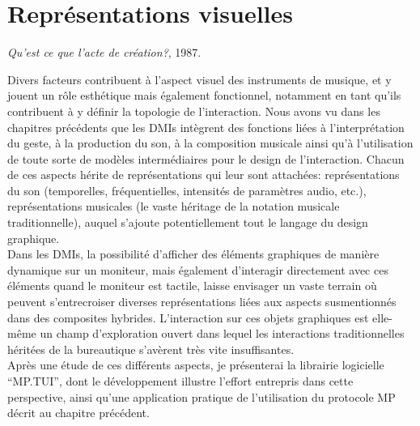 %
\chapter{Représentations visuelles}
\label{ch:visual_representation}

{\textit{Qu'est ce que l'acte de création?}, 1987.\\\cite{deleuze_deux_2003}}

\vspace*{\fill}


\noindent Divers facteurs contribuent à l'aspect visuel des instruments de musique, et y jouent un rôle esthétique mais également fonctionnel, notamment en tant qu'ils contribuent à y définir la topologie de l'interaction. Nous avons vu dans les chapitres précédents que les \glspl{DMI} intègrent des fonctions liées à l'interprétation du geste, à la production du son, à la composition musicale ainsi qu'à l'utilisation de toute sorte de modèles intermédiaires pour le design de l'interaction. Chacun de ces aspects hérite de représentations qui leur sont attachées: représentations du son (temporelles, fréquentielles, intensités de paramètres audio, etc.), représentations musicales (le vaste héritage de la notation musicale traditionnelle), auquel s'ajoute potentiellement tout le langage du design graphique.\\
\indent Dans les \glspl{DMI}, la possibilité d'afficher des éléments graphiques de manière dynamique sur un moniteur, mais également d'interagir directement avec ces éléments quand le moniteur est tactile, laisse envisager un vaste terrain où peuvent s'entrecroiser diverses représentations liées aux aspects susmentionnés dans des composites hybrides. L'interaction sur ces objets graphiques est elle-même un champ d'exploration ouvert dans lequel les interactions traditionnelles héritées de la bureautique s'avèrent très vite insuffisantes.\\
\indent Après une étude de ces différents aspects, je présenterai la librairie logicielle ``MP.TUI'', dont le développement illustre l'effort entrepris dans cette perspective, ainsi qu'une application pratique de l'utilisation du protocole MP décrit au chapitre précédent.


